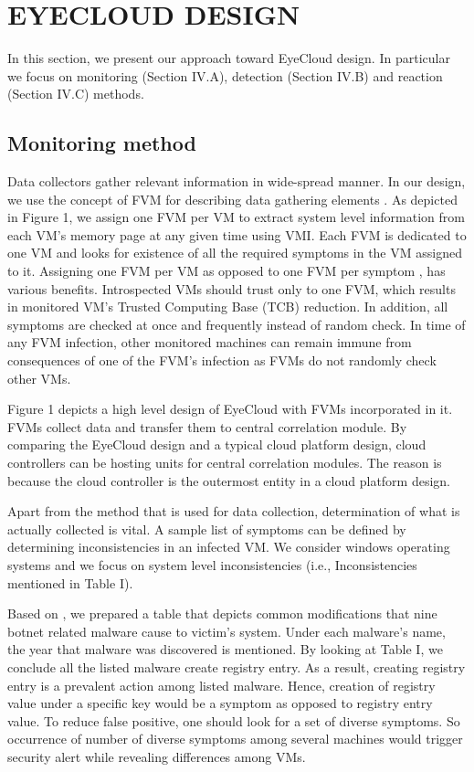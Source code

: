 \documentclass[conference]{IEEEtran}
\begin{document}
\section{EYECLOUD DESIGN}
In this section, we present our approach toward EyeCloud design. In particular we focus on monitoring (Section IV.A), detection (Section IV.B) and reaction (Section IV.C) methods.  
\subsection{Monitoring method}
Data collectors gather relevant information in wide-spread manner. In our design, we use the concept of FVM for describing data gathering elements \cite{ref7}. As depicted in Figure 1, we assign one FVM per VM to extract system level information from each VM's memory page at any given time using VMI. Each FVM is dedicated to one VM and looks for existence of all the required symptoms in the VM assigned to it. Assigning one FVM per VM as opposed to one FVM per symptom \cite{ref7}, has various benefits. Introspected VMs should trust only to one FVM, which results in monitored VM's Trusted Computing Base (TCB) reduction. In addition, all symptoms are checked at once and frequently instead of random check. In time of any FVM infection, other monitored machines can remain immune from consequences of one of the FVM's infection as FVMs do not randomly check other VMs. 

Figure 1 depicts a high level design of EyeCloud with FVMs incorporated in it. FVMs collect data and transfer them to central correlation module. By comparing the EyeCloud design and a typical cloud platform design, cloud controllers can be hosting units for central correlation modules. The reason is because the cloud controller is the outermost entity in a cloud platform design.

Apart from the method that is used for data collection, determination of what is actually collected is vital. A sample list of symptoms can be defined by determining inconsistencies in an infected VM. We consider windows operating systems and we focus on system level inconsistencies (i.e., Inconsistencies mentioned in Table I). 

Based on \cite{ref20}, we prepared a table that depicts common modifications that nine botnet related malware cause to victim's system. Under each malware's name, the year that malware was discovered is mentioned. By looking at Table I, we conclude all the listed malware create registry entry. As a result, creating registry entry is a prevalent action among listed malware. Hence, creation of registry value under a specific key would be a symptom as opposed to registry entry value. To reduce false positive, one should look for a set of diverse symptoms. So occurrence of number of diverse symptoms among several machines would trigger security alert while revealing differences among VMs.
\end{document}
